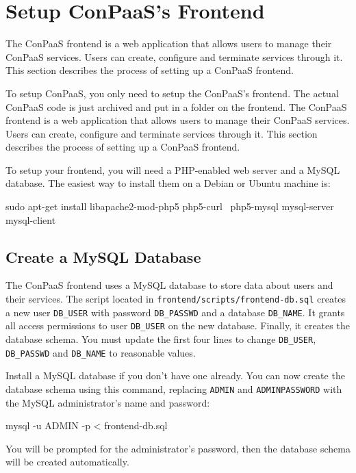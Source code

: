 \documentclass[10pt]{article}
\begin{document}
\section{Setup ConPaaS's Frontend}
\label{sec:frontend}

The ConPaaS frontend is a web application that allows users to manage
their ConPaaS services. Users can create, configure and terminate
services through it. This section describes the process of setting up
a ConPaaS frontend.

To setup ConPaaS, you only need to setup the ConPaaS's frontend. The
actual ConPaaS code is just archived and put in a folder on the frontend.
The ConPaaS frontend is a web application that allows users to manage
their ConPaaS services. Users can create, configure and terminate
services through it. This section describes the process of setting up
a ConPaaS frontend.

To setup your frontend, you will need a PHP-enabled web server and a
MySQL database. The easiest way to install them on a Debian or Ubuntu
machine is:

\begin{code}
  sudo apt-get install libapache2-mod-php5 php5-curl \
     php5-mysql mysql-server mysql-client
\end{code}

\subsection{Create a MySQL Database}

The ConPaaS frontend uses a MySQL database to store data about users
and their services. The script located in
\verb+frontend/scripts/frontend-db.sql+ creates a new user
\verb+DB_USER+ with password \verb+DB_PASSWD+ and a database
\verb+DB_NAME+. It grants all access permissions to user
\verb+DB_USER+ on the new database. Finally, it creates the database
schema. You must update the first four lines to change \verb+DB_USER+,
\verb+DB_PASSWD+ and \verb+DB_NAME+ to reasonable values.

Install a MySQL database if you don't have one already. You can now
create the database schema using this command, replacing \verb+ADMIN+
and \verb+ADMINPASSWORD+ with the MySQL administrator's name and
password:

\begin{code}
  mysql -u ADMIN -p < frontend-db.sql
\end{code}


You will be prompted for the administrator's password, then the
database schema will be created automatically.
\end{document}
